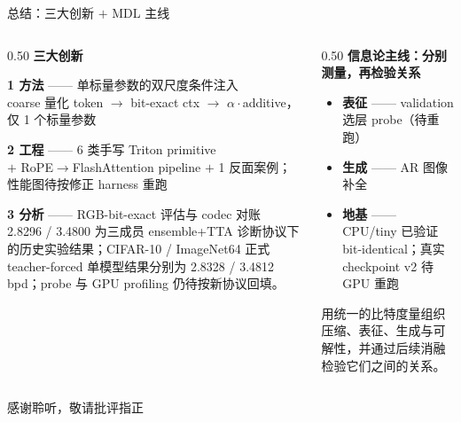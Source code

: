 \documentclass[10pt,aspectratio=169]{beamer}
\begin{document}
\begin{frame}{总结：三大创新 $+$ MDL 主线}
\begin{columns}[T]
\begin{column}{0.50\textwidth}
\small
\textbf{三大创新}

\smallskip
\textbf{1 方法} —— 单标量参数的双尺度条件注入 \\
{\scriptsize coarse 量化 token $\to$ bit-exact ctx $\to$ $\alpha\cdot$additive，仅 1 个标量参数}

\smallskip
\textbf{2 工程} —— 6 类手写 Triton primitive \\
{\scriptsize $+$ RoPE$\to$FlashAttention pipeline $+$ 1 反面案例；性能图待按修正 harness 重跑}

\smallskip
\textbf{3 分析} —— RGB-bit-exact 评估与 codec 对账 \\
{\scriptsize 2.8296 / 3.4800 为三成员 ensemble+TTA 诊断协议下的历史实验结果；CIFAR-10 / ImageNet64 正式 teacher-forced 单模型结果分别为 2.8328 / 3.4812 bpd；probe 与 GPU profiling 仍待按新协议回填。}
\end{column}
\begin{column}{0.50\textwidth}
\small
\textbf{信息论主线：分别测量，再检验关系}

\smallskip
\begin{itemize}\setlength{\itemsep}{2pt}
  \item \textbf{表征} —— validation 选层 probe（待重跑）
  \item \textbf{生成} —— AR 图像补全
  \item \textbf{地基} —— CPU/tiny 已验证 bit-identical；真实 checkpoint v2 待 GPU 重跑
\end{itemize}

\smallskip
{\scriptsize 用统一的比特度量组织压缩、表征、生成与可解性，并通过后续消融检验它们之间的关系。}
\end{column}
\end{columns}

\vfill
\centering
\Large \color{ours} 感谢聆听，敬请批评指正
\end{frame}
\end{document}
